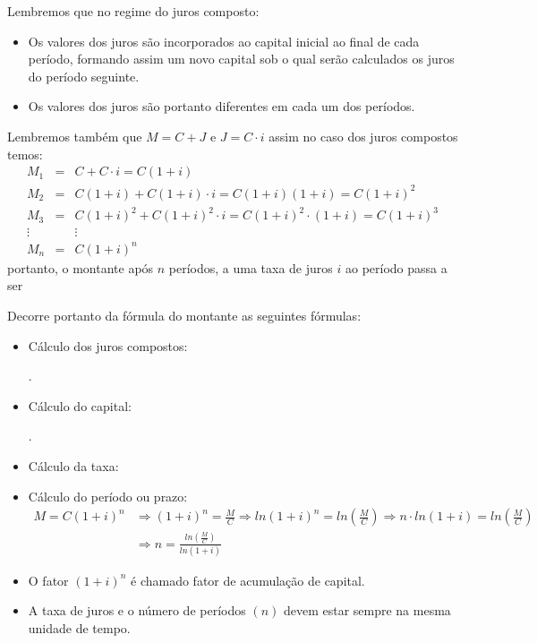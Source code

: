  Lembremos que no regime do juros composto:
 \begin{itemize}
  \item Os valores dos juros são incorporados ao capital inicial ao final de cada período, formando assim um novo capital sob o qual serão calculados os juros do período seguinte.
  \item Os valores dos juros são portanto diferentes em cada um dos períodos.
 \end{itemize}
 Lembremos também que $M= C+J$ e $J= C \cdot i$ assim no caso dos juros compostos temos:
 \begin{eqnarray*}
  M_1&=& C + C \cdot i = C(1+i) \\
  M_2&=& C(1+i) + C(1+i)\cdot i = C(1+i)(1+i)= C(1+i)^2\\
  M_3&=& C(1+i)^2 + C(1+i)^2\cdot i= C(1+i)^2 \cdot (1+i) = C(1+i)^3 \\
  \vdots & & \vdots\\
  M_n&=& C(1+i)^n
 \end{eqnarray*}
 portanto, o montante após $n$ períodos, a uma taxa de juros $i$ ao período passa a ser
 

 Decorre portanto da fórmula do montante as seguintes fórmulas:
 \begin{itemize}
  \item Cálculo dos juros compostos:
  
  .

  \item Cálculo do capital:
  
  .
  
  \item Cálculo da taxa:
  
  
  \item Cálculo do período ou prazo:
  \begin{align*}
  M= C(1+i)^n & \Rightarrow (1+i)^n= \frac{M}{C} \Rightarrow ln(1+i)^n= ln\left(\frac{M}{C}\right) \Rightarrow n \cdot ln(1+i)= ln\left(\frac{M}{C}\right) \\
  & \Rightarrow n= \frac{ln\left(\frac{M}{C}\right)}{ln(1+i)}
  \end{align*}
 \end{itemize}

 \begin{obs}
 \begin{itemize}
  \item O fator $(1+i)^n$ é chamado fator de acumulação de capital.
  \item A taxa de juros e o número de períodos $(n)$ devem estar sempre na mesma unidade de tempo.
 \end{itemize}
 \end{obs}
